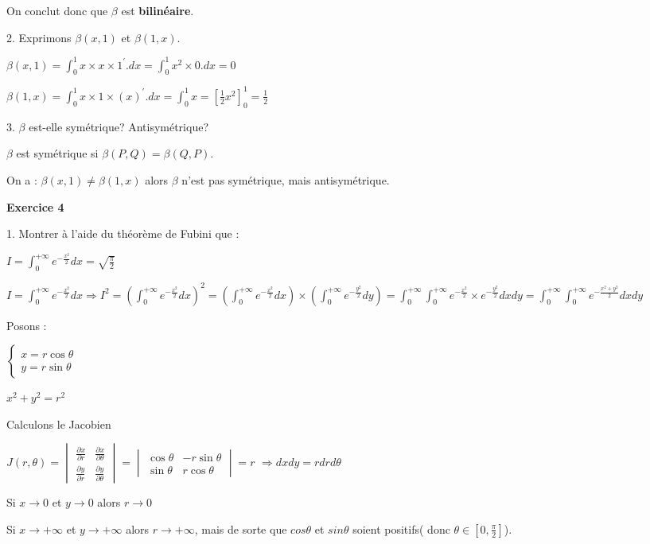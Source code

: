 \documentclass[12pt]{article}
\begin{document}
\begin{spacing}{1.5}
On conclut donc que $\beta$ est \textbf{bilinéaire}.
 

2. Exprimons $\beta(x,1)$ et $\beta(1,x)$.

$\beta(x,1)=\int_{0}^{1}x\times x\times 1^{\prime}. dx=\int_{0}^{1}x^2\times 0.dx =0$

$\beta(1,x)=\int_{0}^{1}x\times 1\times(x)^{\prime}. dx=\int_{0}^{1}x=[\frac{1}{2}x^2]_0^1=\frac{1}{2}$

3. $\beta$ est-elle symétrique? Antisymétrique?

$\beta$ est symétrique si $\beta(P,Q)=\beta(Q,P)$.

On a : $\beta(x,1)\neq\beta(1,x)$ alors $\beta$ n'est pas symétrique, mais antisymétrique.


\medskip
\textbf{Exercice 4}

1. Montrer à l'aide du théorème de Fubini que : 

$I=\int_{0}^{+\infty}e^{-\frac{x^2}{2}}dx=\sqrt{\frac{\pi}{2}}$

$I=\int_{0}^{+\infty}e^{-\frac{x^2}{2}}dx\Longrightarrow I^2=(\int_{0}^{+\infty}e^{-\frac{x^2}{2}}dx)^2=(\int_{0}^{+\infty}e^{-\frac{x^2}{2}}dx)\times (\int_{0}^{+\infty}e^{-\frac{y^2}{2}}dy)=\int_{0}^{+\infty}\int_{0}^{+\infty}e^{-\frac{x^2}{2}}\times e^{-\frac{y^2}{2}}dxdy=\int_{0}^{+\infty}\int_{0}^{+\infty}e^{-\frac{x^2+y^2}{2}}dxdy$

\medskip
Posons :

$\begin{cases}
x=r\cos\theta\\
y=r\sin\theta
\end{cases}$

$x^2+y^2=r^2$

\medskip
Calculons le Jacobien

$J(r,\theta)=\begin{vmatrix}
\frac{\partial x}{\partial r}&\frac{\partial x}{\partial \theta}\\
\frac{\partial y}{\partial r} & \frac{\partial y}{\partial \theta}
\end{vmatrix}=\begin{vmatrix}
\cos\theta & -r\sin\theta\\
\sin\theta & r\cos\theta
\end{vmatrix}=r$ $\Rightarrow dxdy=rdrd\theta$

Si $x\longrightarrow 0$ et $y\longrightarrow 0$ alors $r\longrightarrow 0$

Si $x\longrightarrow +\infty$ et $y\longrightarrow +\infty$ alors $r\longrightarrow +\infty$, mais de sorte que $cos\theta$ et $sin\theta$ soient positifs( donc $\theta\in [0,\frac{\pi}{2}]$).


\end{spacing}
\end{document}

